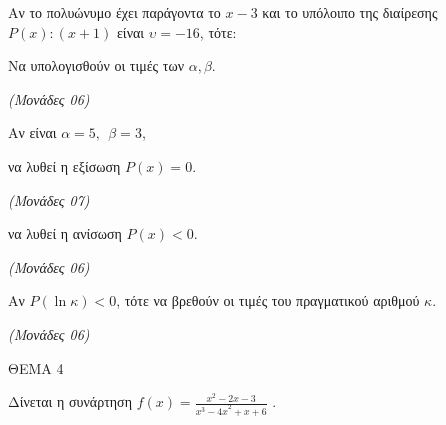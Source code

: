 \documentclass[11pt,a4paper,twoside]{book}
\newcommand{\monades}[1]{\hfill \textit{(Μονάδες #1)}}
\begin{document}
Αν το πολυώνυμο έχει παράγοντα το $x - 3$ και το υπόλοιπο της διαίρεσης $P(x):(x + 1)$ είναι $\upsilon = - 16$, τότε:

\begin{alist}
\item Να υπολογισθούν οι τιμές των $\alpha,\beta$.

\monades{06}

Αν είναι $\alpha = 5,\ \ \beta = 3$,

\item να λυθεί η εξίσωση $P(x) = 0$.

\monades{07}

\item να λυθεί η ανίσωση $P(x) < 0$.

\monades{06}

\item Αν $P\left( \ln\kappa \right) < 0$, τότε να βρεθούν οι τιμές του πραγματικού αριθμού $\kappa$.

\monades{06}
\end{alist}

\vspace{4mm}

ΘΕΜΑ 4

Δίνεται η συνάρτηση $f(x) = \frac{x^{2} - 2x - 3}{{x^{3} - 4x}^{2} + x + 6}$ .
\end{document}
